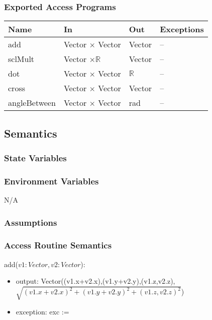 \documentclass[12pt, titlepage]{article}
\begin{document}
\subsubsection{Exported Access Programs}
\begin{center}
	\begin{tabular}{p{4cm} p{2cm} p{2cm} p{4cm}}
		\hline
		\textbf{Name} & \textbf{In} & \textbf{Out} & \textbf{Exceptions} \\
		\hline
		add & Vector $\times$ Vector & Vector & -- \\
		sclMult & Vector $\times \mathbb{R}$ & Vector & -- \\ 
		dot & Vector $\times$ Vector & $\mathbb{R}$ & -- \\
		cross & Vector $\times$ Vector & Vector & -- \\
		angleBetween & Vector $\times$ Vector & rad & -- \\
		\hline
	\end{tabular}
\end{center}

\subsection{Semantics}
\subsubsection{State Variables}

\subsubsection{Environment Variables}
N/A

\subsubsection{Assumptions}

\subsubsection{Access Routine Semantics}
\noindent add($v1:Vector, v2:Vector$):
\begin{itemize}
	\item output: 
	Vector((v1.x+v2.x),(v1.y+v2.y),(v1.z,v2.z), \\
	$\sqrt{(v1.x+v2.x)^2+(v1.y+v2.y)^2+(v1.z,v2.z)^2}$)
	\item exception: exc := \\
\end{itemize}
\end{document}
